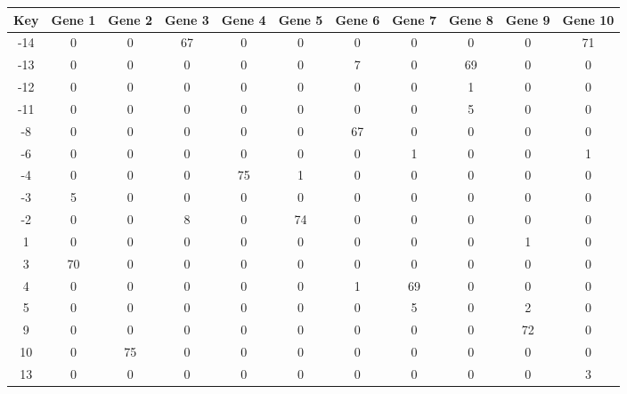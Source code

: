 \begin{tabular}{|c|c|c|c|c|c|c|c|c|c|c|}
\hline
Key & Gene 1 & Gene 2 & Gene 3 & Gene 4 & Gene 5 & Gene 6 & Gene 7 & Gene 8 & Gene 9 & Gene 10 \\
\hline
-14 & 0 & 0 & 67 & 0 & 0 & 0 & 0 & 0 & 0 & 71 \\
-13 & 0 & 0 & 0 & 0 & 0 & 7 & 0 & 69 & 0 & 0 \\
-12 & 0 & 0 & 0 & 0 & 0 & 0 & 0 & 1 & 0 & 0 \\
-11 & 0 & 0 & 0 & 0 & 0 & 0 & 0 & 5 & 0 & 0 \\
-8 & 0 & 0 & 0 & 0 & 0 & 67 & 0 & 0 & 0 & 0 \\
-6 & 0 & 0 & 0 & 0 & 0 & 0 & 1 & 0 & 0 & 1 \\
-4 & 0 & 0 & 0 & 75 & 1 & 0 & 0 & 0 & 0 & 0 \\
-3 & 5 & 0 & 0 & 0 & 0 & 0 & 0 & 0 & 0 & 0 \\
-2 & 0 & 0 & 8 & 0 & 74 & 0 & 0 & 0 & 0 & 0 \\
1 & 0 & 0 & 0 & 0 & 0 & 0 & 0 & 0 & 1 & 0 \\
3 & 70 & 0 & 0 & 0 & 0 & 0 & 0 & 0 & 0 & 0 \\
4 & 0 & 0 & 0 & 0 & 0 & 1 & 69 & 0 & 0 & 0 \\
5 & 0 & 0 & 0 & 0 & 0 & 0 & 5 & 0 & 2 & 0 \\
9 & 0 & 0 & 0 & 0 & 0 & 0 & 0 & 0 & 72 & 0 \\
10 & 0 & 75 & 0 & 0 & 0 & 0 & 0 & 0 & 0 & 0 \\
13 & 0 & 0 & 0 & 0 & 0 & 0 & 0 & 0 & 0 & 3 \\
\hline
\end{tabular}